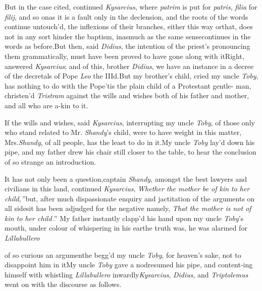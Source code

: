 \documentclass[twoside]{article}
\begin{document}
But in the case cited, continued \textit{Kysarcius}, where
\textit{patrim} is put for \textit{patris}, \textit{filia}
for \textit{filij}, and so on\tsk as it is a fault only in
the declension, and the roots of the words continue
untouch’d, the inflexions of their branches, either this way
or\break that, does not in any sort hinder the baptism,
inasmuch as the same sense\break continues in the words as
before.\tsk But then, said \textit{Didius}, the intention of
the priest’s pronouncing them grammatically, must have been
proved to have gone along with it\tsk Right, answered
\textit{Kysarcius}; and of this, brother \textit{Didius}, we
have an instance in a decree of the de\-cretals of Pope
\textit{Leo} the IIId.\tsk But my brother’s child, cried my
uncle \textit{Toby},\break
has nothing to do with the Pope\tsk ’tis\break
the plain child of a Protestant gentle-\break
man, christen’d \textit{Tristram} against the wills\break
and wishes both of his father and mother,\break
and all who are a-kin to it.\tsk

If the wills and wishes, said \textit{Kysarcius}, interrupting my
uncle \textit{Toby}, of those only who stand related to Mr.\@
\textit{Shandy}’s child, were to have weight in this matter,
Mrs.\@ \textit{Shandy}, of all people, has the least to do in
it.\tsk My uncle \textit{Toby} lay’d down his pipe, and my father drew his chair still closer to
the table, to hear the conclusion of so strange an
introduction.

It has not only been a question,\break captain \textit{Shandy}, amongst the
\lower-3pt\hbox{\ast} best law\-yers and civilians in this land,
continued \textit{Kys\-arcius}, \lqq\textit{Whether the
mother be of kin}\break
\lqq \textit{to her child},\,”\tsk but, after much
dispas\-sionate enquiry and jactitation of the arguments on
all sides\tsk it has been adjudged for the negative\tsk
namely, \lqq\textit{That}\break
\lqq \textit{the mother is not of kin to her child}\,\dagger.”\break
My father instantly clapp’d his hand\break
upon my uncle \textit{Toby}’s mouth, under co\-lour of whispering in his
ear\tsk the truth\break
was, he was alarmed for \textit{Lillabullero}\tsk\break
{}\break
{}
\vskip 2pt
\vskip -3pt

\newpage\noindent
of so curious an argument\tsk he begg’d my
uncle \textit{Toby}, for heaven’s sake, not to disappoint him in it\tsk My uncle
\textit{Toby} gave a nod\tsk resumed his pipe, and
content-\break ing himself with whistling
\textit{Lillabullero}\break
inwardly\tsh \textit{Kysarcius}, \textit{Didius}, and
\textit{Triptolemus} went on with the discourse as follows.
\end{document}
